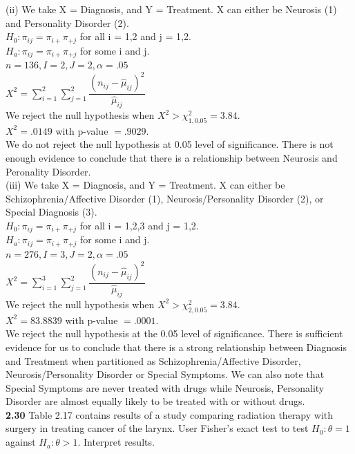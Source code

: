 \documentclass[paper=letter, fontsize=11pt]{scrartcl} %
\begin{document}
(ii)
We take X = Diagnosis, and Y = Treatment. X can either be Neurosis (1) and Personality
Disorder (2). \\
$H_0: \pi_{ij} = \pi_{i+}\pi_{+j}$ for all i = 1,2 and j = 1,2. \\
$H_a: \pi_{ij} = \pi_{i+}\pi_{+j}$ for some i and j. \\
$n = 136, I = 2, J = 2, \alpha = .05$ \\ 
$X^2 = \sum_{i=1}^{2}\sum_{j=1}^{2} \dfrac{(n_{ij}-\hat{\mu}_{ij})^2}{\hat{\mu}_{ij}}$ \\
We reject the null hypothesis when $X^2 > \chi_{1,0.05}^2 = 3.84$. \\
$X^2 = .0149$ with p-value $= .9029$. \\
We do not reject the null hypothesis at 0.05 level of significance. There is not enough
evidence to conclude that there is a relationship between Neurosis and Peronality
Disorder. \\

(iii)
We take X = Diagnosis, and Y = Treatment. X can either be Schizophrenia/Affective
Disorder (1), Neurosis/Personality Disorder (2), or Special Diagnosis (3). \\
$H_0: \pi_{ij} = \pi_{i+}\pi_{+j}$ for all i = 1,2,3 and j = 1,2. \\
$H_a: \pi_{ij} = \pi_{i+}\pi_{+j}$ for some i and j. \\
$n = 276, I = 3, J = 2, \alpha = .05$ \\ 
$X^2 = \sum_{i=1}^{3}\sum_{j=1}^{2} \dfrac{(n_{ij}-\hat{\mu}_{ij})^2}{\hat{\mu}_{ij}}$ \\
We reject the null hypothesis when $X^2 > \chi_{2,0.05}^2 = 3.84$. \\
$X^2 = 83.8839$ with p-value $= .0001$. \\
We reject the null hypothesis at the 0.05 level of significance. There is sufficient
evidence for us to conclude that there is a strong relationship between Diagnosis and
Treatment when partitioned as Schizophrenia/Affective Disorder, Neurosis/Personality
Disorder or Special Symptoms. We can also note that Special Symptoms are never treated
with drugs while Neurosis, Personality Disorder are almost equally likely to be
treated with or without drugs. \\

\textbf{2.30} Table 2.17 contains results of a study comparing radiation therapy with
surgery in treating cancer of the larynx. User Fisher's exact test to test $H_0: \theta =
1$ against $H_a: \theta > 1$. Interpret results. \\
\end{document}
